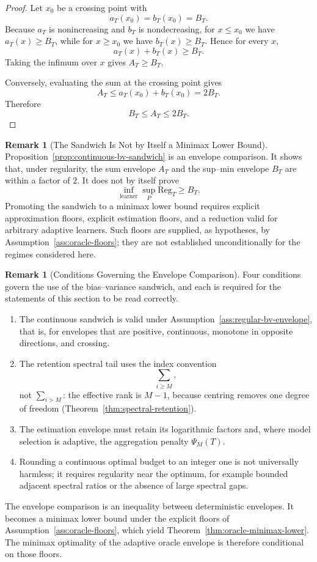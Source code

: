 \documentclass[12pt]{article}
\theoremstyle{definition}
\newtheorem{remark}[theorem]{Remark}
\newcommand{\Reg}{\mathrm{Reg}}
\newcommand{\PsiAgg}{\Psi}
\begin{document}
\begin{proof}
Let $x_0$ be a crossing point with
\[
a_T(x_0)=b_T(x_0)=B_T.
\]
Because $a_T$ is nonincreasing and $b_T$ is nondecreasing, for $x\le x_0$ we
have $a_T(x)\ge B_T$, while for $x\ge x_0$ we have $b_T(x)\ge B_T$.  Hence
for every $x$,
\[
a_T(x)+b_T(x)
\ge
B_T.
\]
Taking the infimum over $x$ gives $A_T\ge B_T$.

Conversely, evaluating the sum at the crossing point gives
\[
A_T
\le
a_T(x_0)+b_T(x_0)
=
2B_T.
\]
Therefore
\[
B_T
\le
A_T
\le
2B_T.
\]
\end{proof}

\begin{remark}[The Sandwich Is Not by Itself a Minimax Lower Bound]
\label{rem:sandwich-not-minimax}
Proposition~\ref{prop:continuous-bv-sandwich} is an envelope comparison.  It
shows that, under regularity, the sum envelope $A_T$ and the sup--min envelope
$B_T$ are within a factor of $2$.  It does not by itself prove
\[
\inf_{\text{learner}}
\sup_{P}
\Reg_T
\ge
B_T.
\]
Promoting the sandwich to a minimax lower bound requires explicit
approximation floors, explicit estimation floors, and a reduction valid for
arbitrary adaptive learners.  Such floors are supplied, as hypotheses, by
Assumption~\ref{ass:oracle-floors}; they are not established unconditionally
for the regimes considered here.
\end{remark}

\begin{remark}[Conditions Governing the Envelope Comparison]
\label{rem:envelope-conditions}
Four conditions govern the use of the bias--variance sandwich, and each is
required for the statements of this section to be read correctly.
\begin{enumerate}[label=(\arabic*)]
\item The continuous sandwich is valid under
Assumption~\ref{ass:regular-bv-envelope}, that is, for envelopes that are
positive, continuous, monotone in opposite directions, and crossing.
\item The retention spectral tail uses the index convention
\[
\sum_{i\ge M},
\]
not $\sum_{i>M}$: the effective rank is $M-1$, because centring removes one
degree of freedom (Theorem~\ref{thm:spectral-retention}).
\item The estimation envelope must retain its logarithmic factors and, where
model selection is adaptive, the aggregation penalty $\PsiAgg_M(T)$.
\item Rounding a continuous optimal budget to an integer one is not universally
harmless; it requires regularity near the optimum, for example bounded
adjacent spectral ratios or the absence of large spectral gaps.
\end{enumerate}
The envelope comparison is an inequality between deterministic envelopes.  It
becomes a minimax lower bound under the explicit floors of
Assumption~\ref{ass:oracle-floors}, which yield
Theorem~\ref{thm:oracle-minimax-lower}.  The minimax optimality of the adaptive
oracle envelope is therefore conditional on those floors.
\end{remark}
\end{document}
